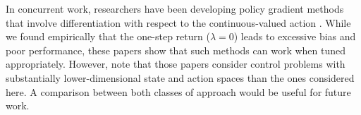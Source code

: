In concurrent work, researchers have been developing policy gradient methods that involve differentiation with respect to the continuous-valued action \citep{lillicrap2015continuous,heess2015learning}. While we found empirically that the one-step return ($\lambda=0$) leads to excessive bias and poor performance, these papers show that such methods can work when tuned appropriately. However, note that those papers consider control problems with substantially lower-dimensional state and action spaces than the ones considered here. A comparison between both classes of approach would be useful for future work.


